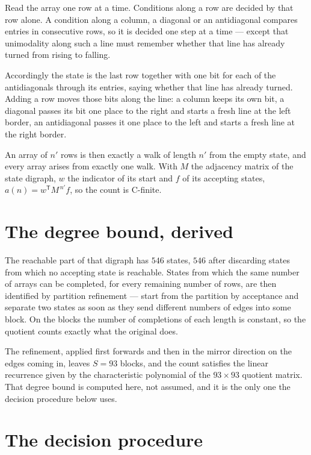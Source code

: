 \documentclass[11pt]{article}
\theoremstyle{definition}
\begin{document}
Read the array one row at a time. Conditions along a row are decided by that row alone. A condition along a column, a diagonal or an antidiagonal compares entries in consecutive rows, so it is decided one step at a time --- except that unimodality along such a line must remember whether that line has already turned from rising to falling.

Accordingly the state is the last row together with one bit for each of the antidiagonals through its entries, saying whether that line has already turned. Adding a row moves those bits along the line: a column keeps its own bit, a diagonal passes its bit one place to the right and starts a fresh line at the left border, an antidiagonal passes it one place to the left and starts a fresh line at the right border.

An array of $n'$ rows is then exactly a walk of length $n'$ from the empty state, and every array arises from exactly one walk. With $M$ the adjacency matrix of the state digraph, $w$ the indicator of its start and $f$ of its accepting states, $a(n) = w^{\mathsf T}M^{\,n'}f$, so the count is C-finite.

\section{The degree bound, derived}

The reachable part of that digraph has $546$ states, $546$ after discarding states from which no accepting state is reachable. States from which the same number of arrays can be completed, for every remaining number of rows, are then identified by partition refinement --- start from the partition by acceptance and separate two states as soon as they send different numbers of edges into some block. On the blocks the number of completions of each length is constant, so the quotient counts exactly what the original does.

The refinement, applied first forwards and then in the mirror direction on the edges coming in, leaves $S = 93$ blocks, and the count satisfies the linear recurrence given by the characteristic polynomial of the $93 \times 93$ quotient matrix. That degree bound is computed here, not assumed, and it is the only one the decision procedure below uses.

\section{The decision procedure}
\end{document}
